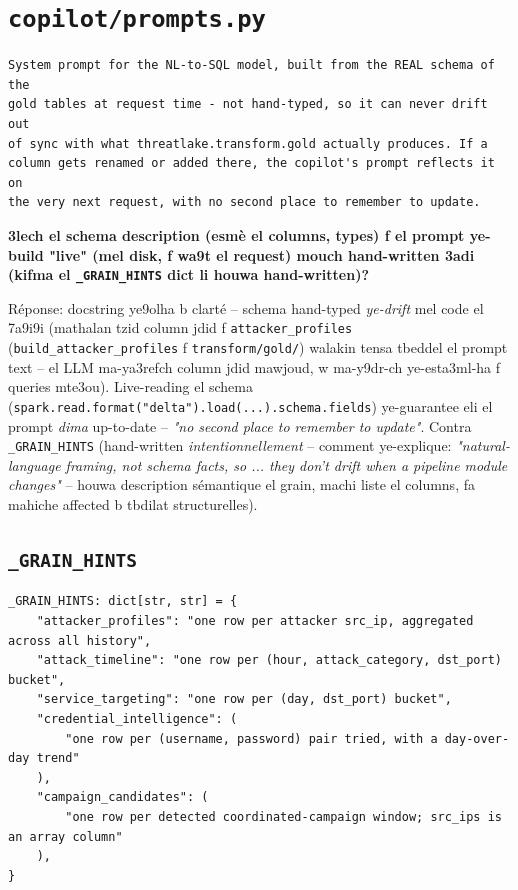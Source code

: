 \documentclass[11pt,a4paper]{report}
\DeclareRobustCommand{\code}[1]{\texttt{#1}}
\DeclareRobustCommand{\file}[1]{\texttt{\color{amber}#1}}
\begin{document}
\section{\file{copilot/prompts.py}}

\begin{lstlisting}[style=pystyle]
System prompt for the NL-to-SQL model, built from the REAL schema of the
gold tables at request time - not hand-typed, so it can never drift out
of sync with what threatlake.transform.gold actually produces. If a
column gets renamed or added there, the copilot's prompt reflects it on
the very next request, with no second place to remember to update.
\end{lstlisting}

\begin{soual}
\textbf{3lech el schema description (esmè el columns, types) f el prompt
ye-build "live" (mel disk, f wa9t el request) mouch hand-written 3adi
(kifma el \code{\_GRAIN\_HINTS} dict li houwa hand-written)?}

Réponse: docstring ye9olha b clarté -- schema hand-typed \emph{ye-drift}
mel code el 7a9i9i (mathalan tzid column jdid f \code{attacker\_profiles}
(\code{build\_attacker\_profiles} f \code{transform/gold/})
walakin tensa tbeddel el prompt text -- el LLM ma-ya3refch column jdid
mawjoud, w ma-y9dr-ch ye-esta3ml-ha f queries mte3ou). Live-reading el
schema (\code{spark.read.format("delta").load(...).schema.fields})
ye-guarantee eli el prompt \emph{dima} up-to-date -- \emph{"no second
place to remember to update"}. Contra \code{\_GRAIN\_HINTS} (hand-written
\emph{intentionnellement} -- comment ye-explique: \emph{"natural-language
framing, not schema facts, so ... they don't drift when a pipeline module
changes"} -- houwa description sémantique el grain, machi liste el
columns, fa mahiche affected b tbdilat structurelles).
\end{soual}

\subsection{\code{\_GRAIN\_HINTS}}

\begin{lstlisting}[style=pystyle]
_GRAIN_HINTS: dict[str, str] = {
    "attacker_profiles": "one row per attacker src_ip, aggregated across all history",
    "attack_timeline": "one row per (hour, attack_category, dst_port) bucket",
    "service_targeting": "one row per (day, dst_port) bucket",
    "credential_intelligence": (
        "one row per (username, password) pair tried, with a day-over-day trend"
    ),
    "campaign_candidates": (
        "one row per detected coordinated-campaign window; src_ips is an array column"
    ),
}
\end{lstlisting}
\end{document}

